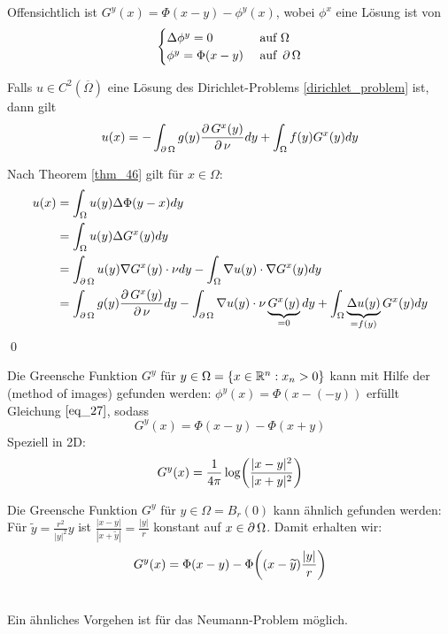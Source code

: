 \begin{bem} \label{bem_47}
	Offensichtlich ist $G^y(x) = \Phi(x-y)-\phi^y(x)$, wobei $\phi^x$ eine Lösung ist von \marginnote{[47]}
	\begin{equation} \begin{cases}
		\Delta \phi^y = 0 & \text{ auf } \Omega \\
		\phi^y = \Phi(x-y) & \text{ auf } \operatorname{\partial} \Omega \end{cases} \label{eq_27}
	\end{equation}
\end{bem}

\begin{thm} \label{thm_48} \label{green_formel}
	Falls $u \in C^2(\overline{\Omega})$ eine Lösung des Dirichlet-Problems \eqref{dirichlet_problem} ist, dann gilt \marginnote{[48]}
	\[ u(x) = -\int_{\operatorname{\partial} \Omega} g(y) \frac{\operatorname{\partial} G^x(y)}{\operatorname{\partial} \nu} dy + \int_{\Omega} f(y) G^x(y) dy \]
\end{thm}
	
	Nach Theorem \ref{thm_46} gilt für $x \in \Omega$:
	\begin{equation}
	\begin{aligned}
	 u(x) 	&= \int_{\Omega} u(y) \Delta \Phi(y-x) dy \\ \notag
			&= \int_{\Omega} u(y) \Delta G^x(y) dy \\
			&= \int_{\operatorname{\partial} \Omega} u(y) \nabla G^x(y) \cdot \nu dy - \int_\Omega \nabla u(y) \cdot \nabla G^x(y) dy \\
			&= \int_{\operatorname{\partial} \Omega} g(y) \frac{\operatorname{\partial} G^x(y)}{\operatorname{\partial} \nu} dy - \int_{\operatorname{\partial} \Omega} \nabla u(y) \cdot \nu \underbrace{G^x(y)}_{=0} dy + \int_{\Omega} \underbrace{\Delta u(y)}_{=f(y)} G^x(y) dy
	\end{aligned}
	\end{equation} \qed
	
\begin{bsp} \label{bsp_49}
	Die Greensche Funktion $G^y$ \marginnote{[49]} für $y \in \Omega = \{x \in \mathbb{R}^n : x_n > 0\}$ kann mit Hilfe der  (method of images) gefunden werden: $\phi^y(x) = \Phi(x-(-y))$ erfüllt Gleichung $\eqref{eq_27}$, sodass
	\[ G^y(x) = \Phi(x-y) - \Phi(x+y) \]
	Speziell in 2D:
	\[ G^y(x) = \frac{1}{4\pi} \log \enbrace*{ \frac{|x-y|^2}{|x+y|^2}}\]
\end{bsp}
	
\begin{bsp} \label{bsp_50}
	Die Greensche Funktion $G^y$ \marginnote{[50]} für $y \in \Omega = B_r(0)$ kann ähnlich gefunden werden: Für $\widetilde{y} = \frac{r^2}{|y|^2}y$ ist $\frac{|x-y|}{|x+\widetilde{y}|} = \frac{|y|}{r}$ konstant auf $x \in \operatorname{\partial} \Omega$. Damit erhalten wir:
	\[ G^y(x) = \Phi(x-y) - \Phi \enbrace*{(x-\widetilde{y}) \frac{|y|}{r}} \]
\end{bsp}

\mbox{} \\
Ein ähnliches Vorgehen ist für das Neumann-Problem möglich.
\newpage